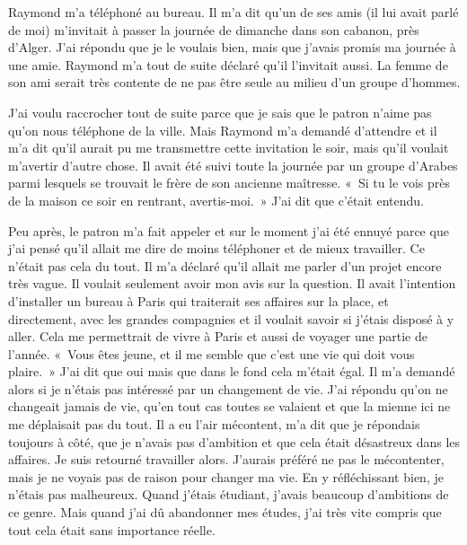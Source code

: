\documentclass[french,twoside]{book} %
\newcommand\chaptercont{} %
\begin{document}
\chaptercont
\noindent Raymond m’a téléphoné au bureau. Il m’a dit qu’un de ses amis (il lui avait parlé de moi) m’invitait à passer la journée de dimanche dans son cabanon, près d’Alger. J'ai répondu que je le voulais bien, mais que j’avais promis ma journée à une amie. Raymond m’a tout de suite déclaré qu’il l’invitait aussi. La femme de son ami serait très contente de ne pas être seule au milieu d’un groupe d’hommes.\par
J'ai voulu raccrocher tout de suite parce que je sais que le patron n’aime pas qu’on nous téléphone de la ville. Mais Raymond m’a demandé d’attendre et il m’a dit qu’il aurait pu me transmettre cette invitation le soir, mais qu’il voulait m’avertir d’autre chose. Il avait été suivi toute la journée par un groupe d’Arabes parmi lesquels se trouvait le frère de son ancienne maîtresse. « Si tu le vois près de la maison ce soir en rentrant, avertis-moi. » J'ai dit que c’était entendu.\par
Peu après, le patron m’a fait appeler et sur le moment j’ai été ennuyé parce que j’ai pensé qu’il allait me dire de moins téléphoner et de mieux travailler. Ce n’était pas cela du tout. Il m’a déclaré qu’il allait me parler d’un projet encore très vague. Il voulait seulement avoir mon avis sur la question. Il avait l’intention d’installer un bureau à Paris qui traiterait ses affaires sur la place, et directement, avec les grandes compagnies et il voulait savoir si j’étais disposé à y aller. Cela me permettrait de vivre à Paris et aussi de voyager une partie de l’année. « Vous êtes jeune, et il me semble que c’est une vie qui doit vous plaire. » J'ai dit que oui mais que dans le fond cela m’était égal. Il m’a demandé alors si je n’étais pas intéressé par un changement de vie. J'ai répondu qu’on ne changeait jamais de vie, qu’en tout cas toutes se valaient et que la mienne ici ne me déplaisait pas du tout. Il a eu l’air mécontent, m’a dit que je répondais toujours à côté, que je n’avais pas d’ambition et que cela était désastreux dans les affaires. Je suis retourné travailler alors. J'aurais préféré ne pas le mécontenter, mais je ne voyais pas de raison pour changer ma vie. En y réfléchissant bien, je n’étais pas malheureux. Quand j’étais étudiant, j’avais beaucoup d’ambitions de ce genre. Mais quand j’ai dû abandonner mes études, j’ai très vite compris que tout cela était sans importance réelle.\par
\end{document}

